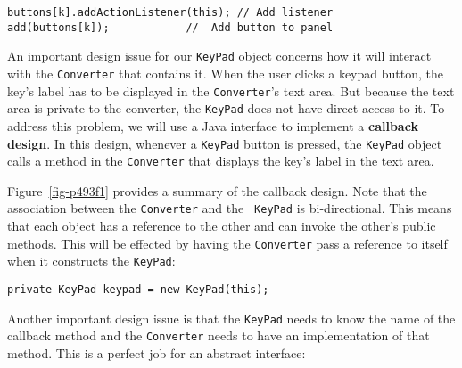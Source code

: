 \begin{jjjlisting}
\begin{lstlisting}
buttons[k].addActionListener(this); // Add listener
add(buttons[k]);            //  Add button to panel
\end{lstlisting}
\end{jjjlisting}

\noindent An important design issue for our {\tt KeyPad} object concerns how it will
interact with the {\tt Converter} that contains it.  When the user
clicks a keypad button, the key's label has to be displayed in the
{\tt Converter}'s text area. But because the text area is private to the
converter, the {\tt KeyPad} does not have direct access to it. To
address this problem, we will use a Java interface to implement a 
{\bf callback design}. In this design, whenever a {\tt KeyPad}
button is pressed, the {\tt KeyPad} object calls a method in the
{\tt Converter} that displays the key's label in the text area.


Figure~\ref{fig-p493f1} provides a summary of the callback design.
Note that the association between the {\tt Converter} and the {\tt
KeyPad} is bi-directional. This means that each object has a reference
to the other and can invoke the other's public methods. This will be
effected by having the {\tt Converter} pass a reference to itself when
it constructs the {\tt KeyPad}:

\begin{figure}[b!]
\end{figure}

\begin{jjjlisting}
\begin{lstlisting}
private KeyPad keypad = new KeyPad(this);
\end{lstlisting}
\end{jjjlisting}

\noindent Another important design issue is that the {\tt KeyPad} needs 
to know the name of the callback method and the {\tt Converter} needs
to have an implementation of that method. This is a perfect job for an
abstract interface:

